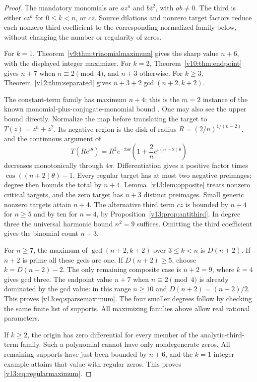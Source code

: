\documentclass[UTF8,11pt]{ctexart}
\theoremstyle{definition}
\numberwithin{equation}{section}
\begin{document}
\begin{proof}
The mandatory monomials are $az^n$ and $b\bar z^2$, with
$ab\ne0$. The third is either $cz^k$ for $0\le k<n$, or
$c\bar z$. Source dilations and nonzero target factors reduce
each nonzero third coefficient to the corresponding normalized
family below, without changing the number or regularity of zeros.

For $k=1$, Theorem~\ref{v9:thm:trinomialmaximum} gives the
sharp value $n+6$, with the displayed integer maximizer.
For $k=2$, Theorem~\ref{v10:thm:endpoint} gives $n+7$ when
$n\equiv2\pmod4$, and $n+3$ otherwise. For $k\ge3$,
Theorem~\ref{v12:thm:separated} gives
$n+3+2\gcd(n+2,k+2)$.

The constant-term family has maximum $n+4$; this is the
$m=2$ instance of the known monomial-plus-conjugate-monomial
bound \cite[Corollary~1.4, author version v2, p.~3]{BBN22}.
One may also see the upper bound directly. Normalize the map
before translating the target to $T(z)=z^n+\bar z^2$.
Its negative region is the disk of radius $R=(2/n)^{1/(n-2)}$,
and the continuous argument of
\[
 T(Re^{i\theta})=R^2e^{-2i\theta}
 \left(1+\frac2n e^{i(n+2)\theta}\right)
\]
decreases monotonically through $4\pi$. Differentiation gives
a positive factor times $\cos((n+2)\theta)-1$.
Every regular target has at most two negative preimages;
degree then bounds the total by $n+4$.
Lemma~\ref{v13:lem:opposite} treats nonzero critical targets,
and the zero target has $n+3$ distinct preimages. Small generic
nonzero targets attain $n+4$.
The alternative third term $c\bar z$ is bounded by $n+4$
for $n\ge5$ and by ten for $n=4$, by
Proposition~\ref{v13:prop:antithird}. In degree three the
universal harmonic bound $n^2=9$ suffices. Omitting the third
coefficient gives the binomial count $n+3$.

For $n\ge7$, the maximum of $\gcd(n+2,k+2)$ over
$3\le k<n$ is $D(n+2)$. If $n+2$ is prime all these gcds
are one. If $D(n+2)\ge5$, choose $k=D(n+2)-2$.
The only remaining composite case is $n+2=9$, where $k=4$
gives gcd three. The endpoint value $n+7$ when
$n\equiv2\pmod4$ is already dominated by the gcd value:
in this range $n\ge10$ and $D(n+2)=(n+2)/2$.
This proves \eqref{v13:eq:sparsemaximum}. The four smaller
degrees follow by checking the same finite list of supports.
All maximizing families above allow real rational parameters.

If $k\ge2$, the origin has zero differential for every member
of the analytic-third-term family. Such a polynomial cannot
have only nondegenerate zeros. All remaining supports have
just been bounded by $n+6$, and the $k=1$ integer example
attains that value with regular zeros. This proves
\eqref{v13:eq:regularmaximum}.
\end{proof}
\end{document}
